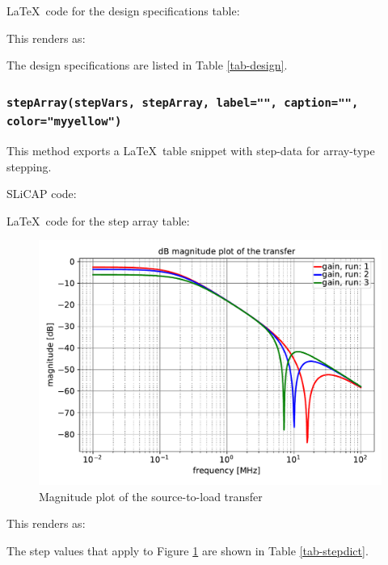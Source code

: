 \documentclass[a4paper,12pt]{article}
\begin{document}
\LaTeX$\,$ code for the design specifications table:



This renders as:

The design specifications are listed in Table \ref{tab-design}.



\subsubsection{\texttt{stepArray(stepVars, stepArray, label="", caption="", \\ color="myyellow")}}

This method exports a \LaTeX$\,$ table snippet with step-data for array-type stepping.

SLiCAP code:



\LaTeX$\,$ code for the step array table:



\begin{figure}[H]
\centering
 \includegraphics[width=12cm]{../img/dBmagStepped.pdf}
 \caption{Magnitude plot of the source-to-load transfer}
 \label{fig-dBmagStepped}
\end{figure}

This renders as:

The step values that apply to Figure \ref{fig-dBmagStepped} are shown in Table \ref{tab-stepdict}.
\end{document}
